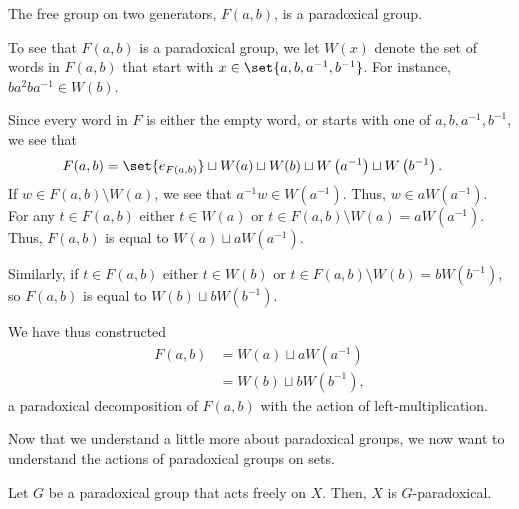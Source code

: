 \begin{example}
  The free group on two generators, $F(a,b)$, is a paradoxical group.\newline

  To see that $F(a,b)$ is a paradoxical group, we let $W(x)$ denote the set of words in $F(a,b)$ that start with $x\in \set{a,b,a^{-1},b^{-1}}$. For instance, $ba^2ba^{-1}\in W(b)$.\newline

  Since every word in $F$ is either the empty word, or starts with one of $a,b,a^{-1},b^{-1}$, we see that
  \begin{align*}
    F(a,b) &= \set{e_{F(a,b)}} \sqcup W(a) \sqcup W(b) \sqcup W\left(a^{-1}\right) \sqcup W\left(b^{-1}\right).
  \end{align*}
  If $w\in F(a,b)\setminus W(a)$, we see that $a^{-1}w\in W\left(a^{-1}\right)$. Thus, $w\in aW\left(a^{-1}\right)$. For any $t\in F(a,b)$ either $t\in W(a)$ or $t\in F(a,b)\setminus W(a) = aW\left(a^{-1}\right)$. Thus, $F\left(a,b\right) $ is equal to $ W(a)\sqcup aW\left(a^{-1}\right)$.\newline

  Similarly, if $t\in F(a,b)$ either $t\in W(b)$ or $t\in F\left(a,b\right)\setminus W(b) = bW\left(b^{-1}\right)$, so $F\left(a,b\right) $ is equal to $ W(b)\sqcup bW\left(b^{-1}\right)$.\newline

  We have thus constructed
  \begin{align*}
    F(a,b) &= W(a)\sqcup aW\left(a^{-1}\right)\\
           &= W(b)\sqcup bW\left(b^{-1}\right),
  \end{align*}
  a paradoxical decomposition of $F(a,b)$ with the action of left-multiplication.
\end{example}
Now that we understand a little more about paradoxical groups, we now want to understand the actions of paradoxical groups on sets.
\begin{proposition}
  Let $G$ be a paradoxical group that acts freely on $X$. Then, $X$ is $G$-paradoxical.
\end{proposition}
